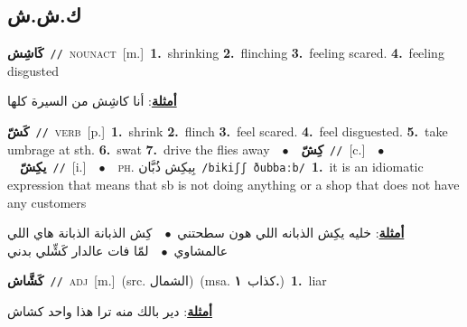 \documentclass[10pt,a4paper,twoside]{article} %
\begin{document}
\begin{multicols}{2}
\vspace{-3mm}
\subsection*{\color{blue}\foreignlanguage{arabic}{ك.ش.ش}\color{blue}{}} 

{\setlength\topsep{0pt}\textbf{\foreignlanguage{arabic}{كَاشِش}}\ {\color{gray}\texttt{//}\color{black}}\ \textsc{noun\textunderscore act}\ [m.]\ \textbf{1.}~shrinking  \textbf{2.}~flinching  \textbf{3.}~feeling scared.  \textbf{4.}~feeling disgusted\  \begin{flushright}\color{gray}\foreignlanguage{arabic}{\textbf{\underline{\foreignlanguage{arabic}{أمثلة}}}: أنا كاشِش من السيرة كلها}\end{flushright}\color{black}} \vspace{2mm}

{\setlength\topsep{0pt}\textbf{\foreignlanguage{arabic}{كَشّ}}\ {\color{gray}\texttt{//}\color{black}}\ \textsc{verb}\ [p.]\ \textbf{1.}~shrink  \textbf{2.}~flinch  \textbf{3.}~feel scared.  \textbf{4.}~feel disguested.  \textbf{5.}~take umbrage at sth.  \textbf{6.}~swat  \textbf{7.}~drive the flies away\ \ $\bullet$\ \ \setlength\topsep{0pt}\textbf{\foreignlanguage{arabic}{كِشّ}}\ {\color{gray}\texttt{//}\color{black}}\ [c.]\ \ $\bullet$\ \ \setlength\topsep{0pt}\textbf{\foreignlanguage{arabic}{يكِشّ}}\ {\color{gray}\texttt{//}\color{black}}\ [i.]\ \ $\bullet$\ \ \textsc{ph.} \color{gray} \foreignlanguage{arabic}{بِيكِش ذُبَّان}\color{black}\ {\color{gray}\texttt{/{\sffamily bikiʃʃ ðubbaːb}/}\color{black}}\ \textbf{1.}~it is an idiomatic expression that means that sb is not doing anything or a shop that does not have any customers\  \begin{flushright}\color{gray}\foreignlanguage{arabic}{\textbf{\underline{\foreignlanguage{arabic}{أمثلة}}}: خليه يكِش الذبانه اللي هون سطحتني\ $\bullet$\ \  كِش الذبانة الذبانة هاي اللي عالمشاوي\ $\bullet$\ \  لمّا فات عالدار كَشِّلي بدني}\end{flushright}\color{black}} \vspace{2mm}

{\setlength\topsep{0pt}\textbf{\foreignlanguage{arabic}{كَشَّاش}}\ {\color{gray}\texttt{//}\color{black}}\ \textsc{adj}\ [m.]\ (src. \color{gray}\foreignlanguage{arabic}{الشمال}\color{black})\ \color{gray}(msa. \foreignlanguage{arabic}{كذاب}~\foreignlanguage{arabic}{\textbf{١.}})\color{black}\ \textbf{1.}~liar\  \begin{flushright}\color{gray}\foreignlanguage{arabic}{\textbf{\underline{\foreignlanguage{arabic}{أمثلة}}}: دير بالك منه ترا هذا واحد كشاش}\end{flushright}\color{black}} \vspace{2mm}


\end{multicols}
\end{document}
